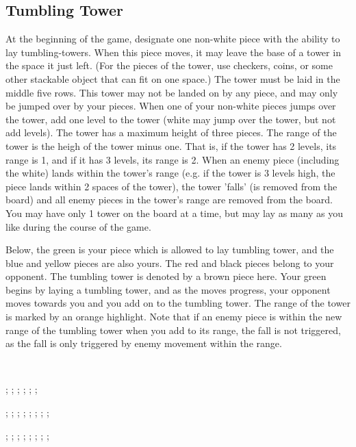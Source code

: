 \documentclass[../rulebook.tex]{subfiles}
\begin{document}
\subsection*{Tumbling Tower}

At the beginning of the game,
designate one non-white piece with the ability to lay tumbling-towers.
When this piece moves,
it may leave the base of a tower in the space it just left.
(For the pieces of the tower, use checkers, coins,
or some other stackable object that can fit on one space.)
The tower must be laid in the middle five rows.
This tower may not be landed on by any piece,
and may only be jumped over by your pieces.
When one of your non-white pieces jumps over the tower,
add one level to the tower
(white may jump over the tower, but not add levels).
The tower has a maximum height of three pieces.
The range of the tower is the heigh of the tower minus one.
That is, if the tower has 2 levels, its range is 1,
and if it has 3 levels, its range is 2.
When an enemy piece (including the white) lands within the tower's range
(e.g. if the tower is 3 levels high, the piece lands within
2 spaces of the tower),
the tower 'falls' (is removed from the board)
and all enemy pieces in the tower's range
are removed from the board. 
You may have only 1 tower on the board at a time,
but may lay as many as you like during the course of the game. 

Below, the green is your piece which is allowed to lay tumbling tower,
and the blue and yellow pieces are also yours.
The red and black pieces belong to your opponent.
The tumbling tower is denoted by a brown piece here.
Your green begins by laying a tumbling tower, and as the moves progress,
your opponent moves towards you and you add on to the tumbling tower.
The range of the tower is marked by an orange highlight.
Note that if an enemy piece is within the new range of the tumbling tower
when you add to its range, the fall is not triggered, as the fall is
only triggered by enemy movement within the range.

\

\begin{center}
  \begin{struggleboard}
    ;
    ;
    ;
    ;
    ;
    ;
  \end{struggleboard}
  \begin{struggleboard}
    ;
    ;
    ;
    ;
    ;
    ;
    ;
    ;
  \end{struggleboard}
  \begin{struggleboard}
    ;
    ;
    ;
    ;
    ;
    ;
    ;
    ;
  \end{struggleboard}
\end{center}
\end{document}
